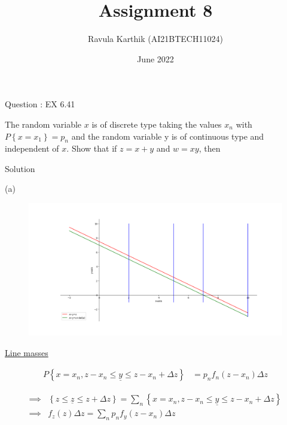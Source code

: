 \documentclass[journal,12pt,twocolumn]{beamer}
\title{Assignment 8}
\author{Ravula Karthik (AI21BTECH11024)}
\date {June 2022}
\providecommand{\brak}[1]{\ensuremath{\left(#1\right)}}
\providecommand{\cbrak}[1]{\ensuremath{\left\{#1\right\}}}
\begin{document}
	\begin{frame}
		\titlepage 
	\end{frame}
	
	\begin{frame}{Question : EX 6.41}
		
	The random variable $x$ is of discrete type taking the values $ x_n $ with $P\cbrak{x=x_1} = p_n$ and the
	random variable y is of continuous type and independent of $x$. Show that if $z = x + y$ and
	$w = xy$, then
	\end{frame}
	\begin{frame}{Solution}
		
	
	(a)
	
	\begin{figure}[H]
		\centering
		\includegraphics[width=\columnwidth]{figs/assign_8_Figure_1.png}
		\label{Fig1}	
	\end{figure}

	\end{frame}
	
	\begin{frame}
		\underline{Line masses}
		
		\begin{align}
			P\cbrak{x=x_n ,z-x_n \le \underline{y} \leq z-x_n +\Delta z} &= p_nf_n\brak{z-x_n}\Delta z       \nonumber
		\end{align} 
		
		\begin{align}
			\implies &\cbrak{z \le \underline{z} \leq z+\Delta z} = \sum_{n} \cbrak{x=x_n ,z-x_n \le \underline{y} \leq z-x_n +\Delta z}   \\
			\implies &f_z\brak{z} \Delta z = \sum_{n} p_nf_y\brak{z-x_n}\Delta z
		\end{align} 
		
	\end{frame}
	
\end{document}
